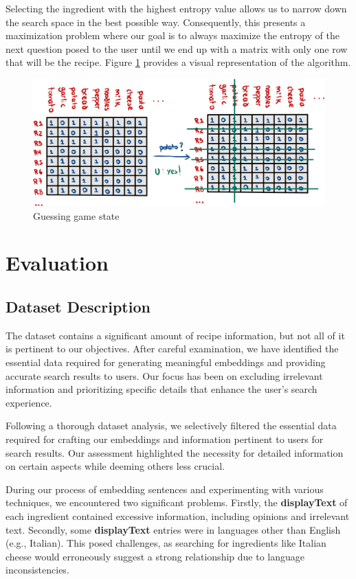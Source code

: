 \documentclass[runningheads]{llncs}
\begin{document}
Selecting the ingredient with the highest entropy value allows us to narrow down the search space in the best possible way. Consequently, this presents a maximization problem where our goal is to always maximize the entropy of the next question posed to the user until we end up with a matrix with only one row that will be the recipe. Figure \ref{akimat} provides a visual representation of the algorithm.

\begin{figure}[!htbp]
    \center
    \includegraphics[scale=0.15]{images/akinator}
    \caption{Guessing game state}
    \label{akimat}
\end{figure}

\section{Evaluation}
\subsection{Dataset Description}
The dataset contains a significant amount of recipe information, but not all of it is pertinent to our objectives. After careful examination, we have identified the essential data required for generating meaningful embeddings and providing accurate search results to users. Our focus has been on excluding irrelevant information and prioritizing specific details that enhance the user's search experience.

Following a thorough dataset analysis, we selectively filtered the essential data required for crafting our embeddings and information pertinent to users for search results. Our assessment highlighted the necessity for detailed information on certain aspects while deeming others less crucial.

During our process of embedding sentences and experimenting with various techniques, we encountered two significant problems. Firstly, the \textbf{displayText} of each ingredient contained excessive information, including opinions and irrelevant text. Secondly, some \textbf{displayText} entries were in languages other than English (e.g., Italian). This posed challenges, as searching for ingredients like Italian cheese would erroneously suggest a strong relationship due to language inconsistencies.
\end{document}
